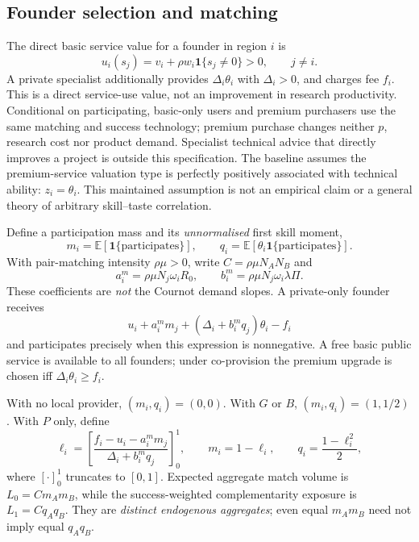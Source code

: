 \subsection{Founder selection and matching}
The direct basic service value for a founder in region $i$ is
\begin{equation}
 u_i(s_j)=v_i+\rho w_i\mathbf1\{s_j\neq0\}>0,\qquad j\ne i.
\end{equation}
A private specialist additionally provides $\Delta_i\theta_i$ with $\Delta_i>0$, and charges fee $f_i$.
This is a direct service-use value, not an improvement in research productivity.
Conditional on participating, basic-only users and premium purchasers use the same matching and success technology; premium purchase changes neither $p$, research cost nor product demand.
Specialist technical advice that directly improves a project is outside this specification. The baseline assumes the premium-service valuation type is perfectly positively associated with technical ability: $z_i=\theta_i$. This maintained assumption is not an empirical claim or a general theory of arbitrary skill--taste correlation.

Define a participation mass and its \emph{unnormalised} first skill moment,
\begin{equation}
 m_i=\mathbb E[\mathbf1\{\mathrm{participates}\}],\qquad
 q_i=\mathbb E[\theta_i\mathbf1\{\mathrm{participates}\}].
 \label{eq:m-q}
\end{equation}
With pair-matching intensity $\rho\mu>0$, write $C=\rho\mu N_AN_B$ and
\begin{equation}
 a_i^m=\rho\mu N_j\omega_i R_0,\qquad
 b_i^m=\rho\mu N_j\omega_i\lambda\Pi.
 \label{eq:matchingcoeff}
\end{equation}
These coefficients are \emph{not} the Cournot demand slopes. A private-only founder receives
\begin{equation}
 u_i+a_i^m m_j+(\Delta_i+b_i^m q_j)\theta_i-f_i
 \label{eq:founderpayoff}
\end{equation}
and participates precisely when this expression is nonnegative. A free basic public service is available to all founders; under co-provision the premium upgrade is chosen iff $\Delta_i\theta_i\geq f_i$.

With no local provider, $(m_i,q_i)=(0,0)$. With $G$ or $B$, $(m_i,q_i)=(1,1/2)$. With $P$ only, define
\begin{equation}
 \ell_i=\left[\frac{f_i-u_i-a_i^m m_j}
                       {\Delta_i+b_i^m q_j}\right]_0^1,\qquad
 m_i=1-\ell_i,\qquad q_i=\frac{1-\ell_i^2}{2},
 \label{eq:participation}
\end{equation}
where $[\cdot]_0^1$ truncates to $[0,1]$. Expected aggregate match volume is
$L_0=Cm_Am_B$, while the success-weighted complementarity exposure is $L_1=Cq_Aq_B$. They are \emph{distinct endogenous aggregates}; even equal $m_A m_B$ need not imply equal $q_Aq_B$.

